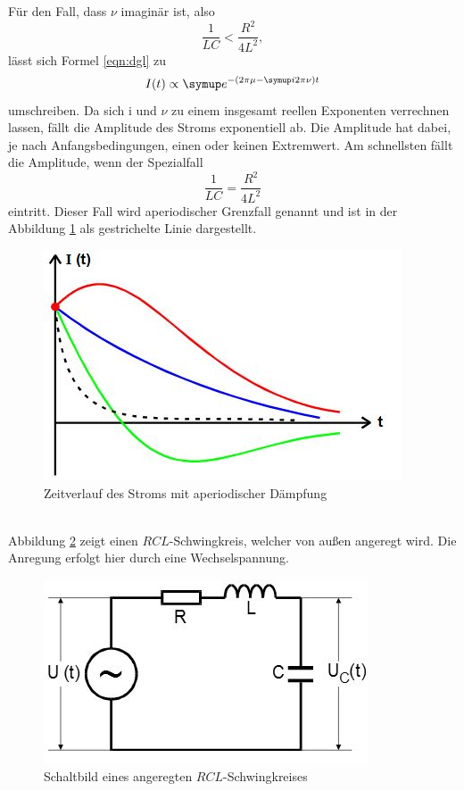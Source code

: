 Für den Fall, dass $\nu$ imaginär ist, also
\begin{equation*}
  \frac{1}{LC} < \frac{R^2}{4L^2} ,
\end{equation*}
lässt sich Formel \eqref{eqn:dgl} zu
\begin{equation}
  I(t)\propto\su{e}^{-(2\pi\mu -\su{i}2\pi\nu)t}
\end{equation}
umschreiben.
Da sich i und $\nu$ zu einem insgesamt reellen Exponenten verrechnen lassen, fällt
die Amplitude des Stroms exponentiell ab. Die Amplitude hat dabei, je nach
Anfangsbedingungen, einen oder keinen Extremwert. Am schnellsten fällt die
Amplitude, wenn der Spezialfall
\begin{equation}
  \frac{1}{LC} = \frac{R^2}{4L^2}
  \label{eqn:r_ap}
\end{equation}
eintritt. Dieser Fall wird aperiodischer Grenzfall genannt und ist in der
Abbildung \ref{fig:agf} als gestrichelte Linie dargestellt.
\begin{figure}[h]
  \centering
  \includegraphics{Bilder/aperiod.JPG}
  \caption{Zeitverlauf des Stroms mit aperiodischer Dämpfung\,\cite{354}}
  \label{fig:agf}
\end{figure}
\\
Abbildung \ref{fig:angeregt} zeigt einen $RCL$-Schwingkreis, welcher von
außen angeregt wird. Die Anregung erfolgt hier durch eine Wechselspannung.
\begin{figure}[h]
  \centering
  \includegraphics{Bilder/angeregt.JPG}
  \caption{Schaltbild eines angeregten $RCL$-Schwingkreises\,\cite{354}}
  \label{fig:angeregt}
\end{figure}

